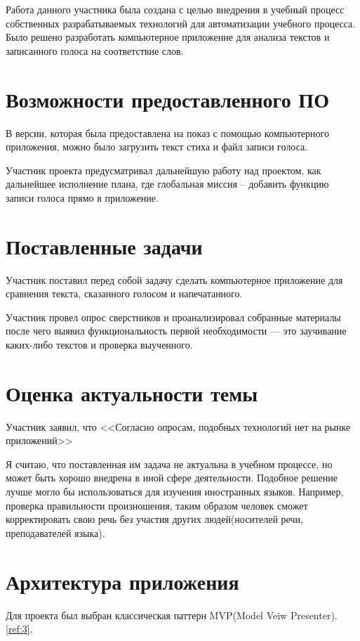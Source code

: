 \documentclass[12pt]{report}
\begin{document}
Работа данного участника была создана с целью внедрения в учебный процесс
собственных разрабатываемых технологий для автоматизации учебного процесса.
Было решено разработать компьютерное приложение для анализа текстов и записанного голоса на соответствие слов.

\section{Возможности предоставленного ПО}

В версии, которая была предоставлена на показ с помощью компьютерного приложения, можно было
загрузить текст стиха и файл записи голоса.

Участник проекта предусматривал дальнейшую работу над проектом,
как дальнейшее исполнение плана, где глобальная миссия -- добавить функцию записи голоса прямо в приложение.

\section{Поставленные задачи}

Участник поставил перед собой задачу сделать компьютерное приложение для сравнения текста, сказанного голосом и напечатанного. 

Участник провел опрос сверстников и проанализировал собранные материалы после чего 
выявил функциональность первой необходимости — это заучивание каких-либо текстов и проверка выученного.

\section{Оценка актуальности темы}

Участник заявил, что <<Согласно опросам, подобных технологий нет на рынке приложений>>

Я считаю, что поставленная им задача не актуальна в учебном процессе, но может быть хорошо внедрена в иной сфере деятельности. Подобное решение лучше могло бы использоваться для изучения иностранных языков. Например, проверка правильности произношения, таким образом человек сможет корректировать свою речь без участия других людей(носителей речи, преподавателей языка).

\section{Архитектура приложения}

Для проекта был выбран классическая паттерн MVP(Model Veiw Presenter). \ref{ref:3}.
\end{document}
